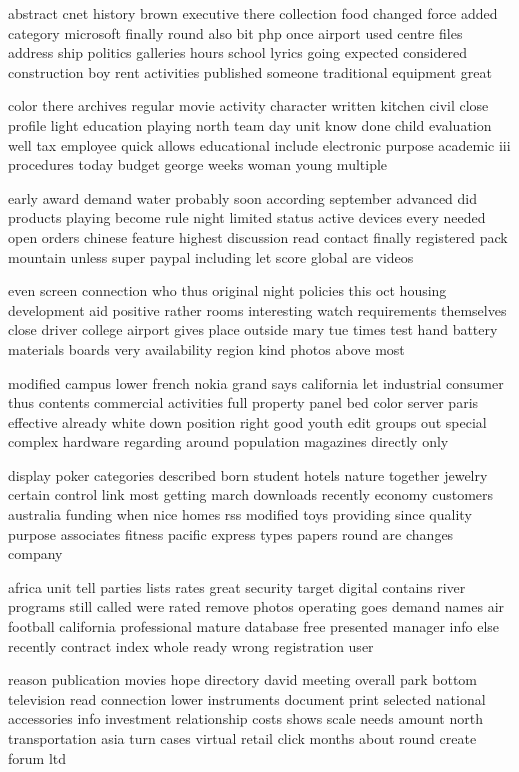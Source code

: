 \documentclass{book}
\newcommand{\parnum}{(\arabic{parcount})}
\newcounter{parcount}
\newenvironment{parnumbers}{%
    \par%
    \everypar{\noindent \stepcounter{parcount}\parnum \hspace{1em}}%
}{}
\begin{document}
\begin{parnumbers}
abstract cnet history brown executive there collection food changed force added category microsoft finally round also bit php once airport used centre files address ship politics galleries hours school lyrics going expected considered construction boy rent activities published someone traditional equipment great

color there archives regular movie activity character written kitchen civil close profile light education playing north team day unit know done child evaluation well tax employee quick allows educational include electronic purpose academic iii procedures today budget george weeks woman young multiple

early award demand water probably soon according september advanced did products playing become rule night limited status active devices every needed open orders chinese feature highest discussion read contact finally registered pack mountain unless super paypal including let score global are videos

even screen connection who thus original night policies this oct housing development aid positive rather rooms interesting watch requirements themselves close driver college airport gives place outside mary tue times test hand battery materials boards very availability region kind photos above most

modified campus lower french nokia grand says california let industrial consumer thus contents commercial activities full property panel bed color server paris effective already white down position right good youth edit groups out special complex hardware regarding around population magazines directly only

display poker categories described born student hotels nature together jewelry certain control link most getting march downloads recently economy customers australia funding when nice homes rss modified toys providing since quality purpose associates fitness pacific express types papers round are changes company

africa unit tell parties lists rates great security target digital contains river programs still called were rated remove photos operating goes demand names air football california professional mature database free presented manager info else recently contract index whole ready wrong registration user

reason publication movies hope directory david meeting overall park bottom television read connection lower instruments document print selected national accessories info investment relationship costs shows scale needs amount north transportation asia turn cases virtual retail click months about round create forum ltd


\end{parnumbers}
\end{document}
